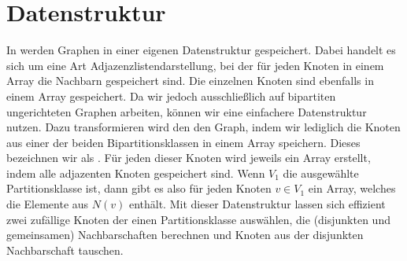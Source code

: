 \section{Datenstruktur}
In \nk werden Graphen in einer eigenen Datenstruktur gespeichert.
Dabei handelt es sich um eine Art Adjazenzlistendarstellung, bei der für jeden Knoten 
in einem Array die Nachbarn gespeichert sind. Die einzelnen Knoten sind ebenfalls in
einem Array gespeichert. Da wir jedoch ausschließlich auf bipartiten ungerichteten Graphen
arbeiten, können wir eine einfachere Datenstruktur nutzen. Dazu transformieren wird den
den Graph, indem wir lediglich
die Knoten aus einer der beiden Bipartitionsklassen  
in einem Array speichern. Dieses bezeichnen wir als \red{\fett{\partvek}}.
Für jeden dieser Knoten wird jeweils ein Array erstellt, indem alle adjazenten Knoten gespeichert sind.
Wenn $V_{1}$ die ausgewählte Partitionsklasse ist, dann gibt es also für jeden Knoten $v\in V_{1}$
ein Array, welches die Elemente aus $N(v)$ enthält.
Mit dieser Datenstruktur lassen sich effizient zwei zufällige Knoten der einen Partitionsklasse
auswählen, die (disjunkten und gemeinsamen) Nachbarschaften berechnen und Knoten aus der
disjunkten Nachbarschaft tauschen.


